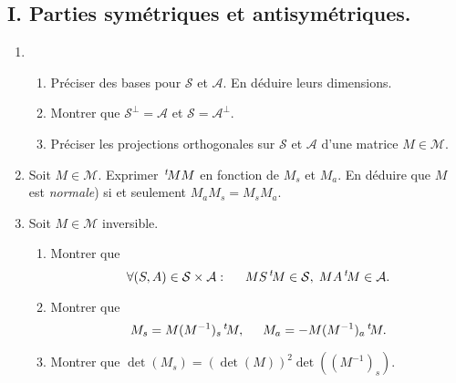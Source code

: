 \subsection*{I. Parties symétriques et antisymétriques.}
\begin{enumerate}
 \item
 \begin{enumerate}
  \item Préciser des bases pour $\mathcal{S}$ et $\mathcal{A}$. En déduire leurs dimensions.
  \item Montrer que $\mathcal{S}^\bot = \mathcal{A}$ et $\mathcal{S} = \mathcal{A}^\bot$.
  \item Préciser les projections orthogonales sur $\mathcal{S}$ et $\mathcal{A}$ d'une matrice $M\in \mathcal{M}$.
 \end{enumerate}
 
 \item Soit $M\in \mathcal{M}$. Exprimer $\,\mathstrut^t\!{M} M$ en fonction de $M_s$ et $M_a$. En déduire que $M$ est \emph{normale}) si et seulement $M_a M_s = M_s M_a$.

 \item Soit $M\in \mathcal{M}$ inversible. 
 \begin{enumerate}
  \item  Montrer que 
\[
 \forall (S,A) \in \mathcal{S} \times\mathcal{A}: \hspace{0.5cm} M S \,\mathstrut^t\!{M} \in \mathcal{S}, \;  M A \,\mathstrut^t\!{M} \in \mathcal{A}.
\]
  \item Montrer que
\[
 M_s = M (M^{-1})_s \,\mathstrut^t\!{M}, \hspace{0.5cm} M_a = - M (M^{-1})_a \,\mathstrut^t\!{M}.
\]
  \item Montrer que $\det(M_s) = (\det(M))^2 \det((M^{-1})_s)$.
 \end{enumerate}

\end{enumerate}

